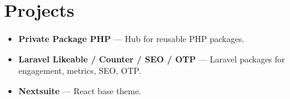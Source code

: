 \section*{Projects}
\begin{itemize}
  \item \textbf{Private Package PHP} --- Hub for reusable PHP packages.
  \item \textbf{Laravel Likeable / Counter / SEO / OTP} --- Laravel packages for engagement, metrics, SEO, OTP.
  \item \textbf{Nextsuite} --- React base theme.
\end{itemize}
